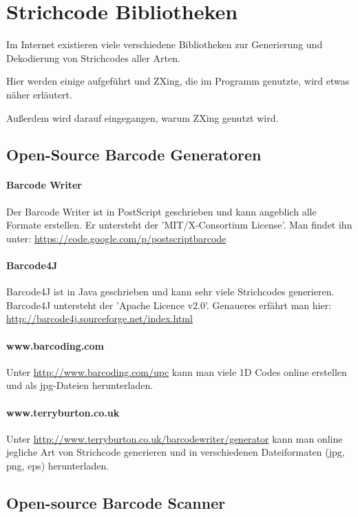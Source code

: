 \section{Strichcode Bibliotheken}
\writtenby{\dcauthornameriren}%
Im Internet existieren viele verschiedene Bibliotheken zur Generierung und Dekodierung von Strichcodes aller Arten.

Hier werden einige aufgeführt und ZXing, die im Programm genutzte, wird etwas näher erläutert.

Außerdem wird darauf eingegangen, warum ZXing genutzt wird.


\subsection*{Open-Source Barcode Generatoren}

\paragraph*{Barcode Writer}
Der Barcode Writer ist in PostScript geschrieben und kann angeblich alle Formate erstellen. Er untersteht der 'MIT/X-Consortium License'. Man findet ihn unter: \url{https://code.google.com/p/postscriptbarcode}

\paragraph*{Barcode4J}
Barcode4J ist in Java geschrieben und kann sehr viele Strichcodes generieren. Barcode4J untersteht der 'Apache Licence v2.0'. Genaueres erfährt man hier: \url{http://barcode4j.sourceforge.net/index.html}

\paragraph*{www.barcoding.com}
Unter \url{http://www.barcoding.com/upc} kann man viele 1D Codes online erstellen und als jpg-Dateien herunterladen.

\paragraph*{www.terryburton.co.uk}
Unter \url{http://www.terryburton.co.uk/barcodewriter/generator} kann man online jegliche Art von Strichcode generieren und in verschiedenen Dateiformaten (jpg, png, eps) herunterladen.


\subsection*{Open-source Barcode Scanner}

